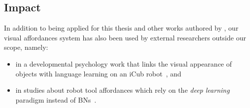\subsection{Impact}
\label{sec:platform:software_architecture:impact}

In addition to being applied for this thesis and other works authored by \myFullName, our visual affordances system has also been used by external researchers outside our scope,
namely:
\begin{itemize}
    \item in a developmental psychology work that links the visual appearance of objects with language learning on an iCub robot~\cite{morse:2016:cogsci}, and

    \item in studies about robot tool affordances which rely on the \emph{deep learning} paradigm instead of \aclp{BN}~\cite{dehban:2016:eccvws,dehban:2016:icra,dehban:2017:humanoids}.
\end{itemize}
